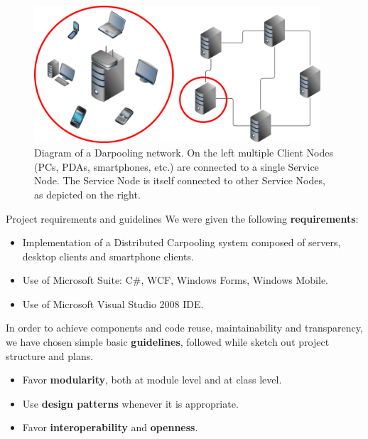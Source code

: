 \documentclass[mathserif]{beamer}
\begin{document}
\begin{frame}[plain]
\begin{figure}
\begin{center}
\includegraphics[width=0.95\textwidth]{img/darpooling.png}
\end{center}
\begin{flushleft}
\caption{Diagram of a Darpooling network. On the left multiple Client Nodes
(PCs, PDAs, smartphones, etc.) are connected to a single Service Node.
The Service
Node is itself connected to other Service Nodes, as depicted on the right.}
\end{flushleft}
\end{figure}
\end{frame}

\begin{frame}{Project requirements and guidelines}
We were given the following \textbf{requirements}:
\begin{itemize}
\item
Implementation of a Distributed Carpooling system composed of servers, desktop clients and smartphone clients.
\item
Use of Microsoft Suite: C\#, WCF, Windows Forms, Windows Mobile.
\item
Use of Microsoft Visual Studio 2008 IDE.
\end{itemize}
\vfill

In order to achieve components and code reuse, maintainability and
transparency, we have chosen simple basic \textbf{guidelines}, followed
while sketch out project structure and plans.
\begin{itemize}
\item
Favor \textbf{modularity}, both at module level and at class level.
\item
Use \textbf{design patterns} whenever it is appropriate.
\item
Favor \textbf{interoperability} and \textbf{openness}.
\end{itemize}
\end{frame}
\end{document}
